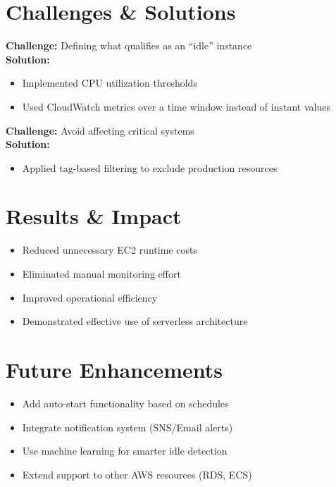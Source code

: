 \documentclass[12pt, a4paper, oneside]{report}
\begin{document}
\section{Challenges \& Solutions}

\noindent\textbf{Challenge:} Defining what qualifies as an ``idle'' instance\\
\textbf{Solution:}
\begin{itemize}[leftmargin=1.5cm]
    \item Implemented CPU utilization thresholds
    \item Used CloudWatch metrics over a time window instead of instant values
\end{itemize}

\noindent\textbf{Challenge:} Avoid affecting critical systems\\
\textbf{Solution:}
\begin{itemize}[leftmargin=1.5cm]
    \item Applied tag-based filtering to exclude production resources
\end{itemize}

\section{Results \& Impact}
\begin{itemize}[leftmargin=1.5cm]
    \item Reduced unnecessary EC2 runtime costs
    \item Eliminated manual monitoring effort
    \item Improved operational efficiency
    \item Demonstrated effective use of serverless architecture
\end{itemize}

\section{Future Enhancements}
\begin{itemize}[leftmargin=1.5cm]
    \item Add auto-start functionality based on schedules
    \item Integrate notification system (SNS/Email alerts)
    \item Use machine learning for smarter idle detection
    \item Extend support to other AWS resources (RDS, ECS)
\end{itemize}
\end{document}
